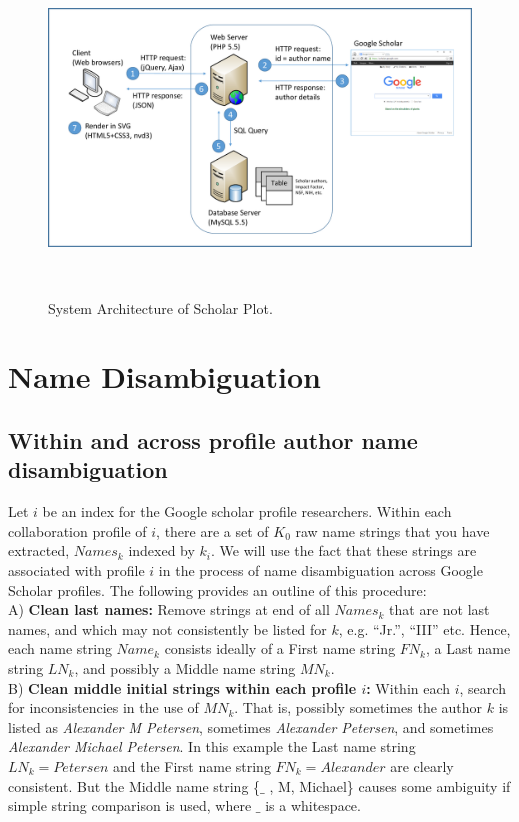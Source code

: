 \begin{figure}
\centering
  \includegraphics[width=1\columnwidth]{figures/fig_system_architecture.pdf}
  \caption{System Architecture of Scholar Plot.}~\label{fig:fig-arch}
\end{figure}

\section{Name Disambiguation}
\subsection{Within and across profile author name disambiguation}

Let $i$ be an index for the Google scholar profile researchers. Within each collaboration profile of $i$,  there are a set of $K_{0}$ raw name strings that you have extracted,  $Names_{k}$ indexed by $k_{i}$. We will use the fact that these strings are associated with profile $i$ in the process of name disambiguation across Google Scholar profiles. The following provides an outline of this procedure: \\


A) {\bf Clean last names:} 
Remove strings at end of all $Names_{k}$ that are not last names, and which may not consistently be listed for $k$, e.g. ``Jr.'', ``III'' etc. Hence, each name string  $Name_{k}$ consists ideally of a First name string $FN_{k}$, a Last name string $LN_{k}$, and possibly a Middle name string $MN_{k}$. \\

B)  {\bf Clean middle initial strings within each profile $i$:}  Within each $i$, search for inconsistencies in the use of $MN_{k}$. That is, possibly sometimes the author $k$ is listed as {\it Alexander M Petersen}, sometimes {\it Alexander Petersen}, and sometimes {\it Alexander Michael Petersen}. In this example the Last name string $LN_{k} = Petersen$ and the First name string $FN_{k} = Alexander$ are clearly consistent. But the Middle name string \{$\_$ , M, Michael\} causes some ambiguity if simple string comparison is used,  where $\_$ is a whitespace. 

